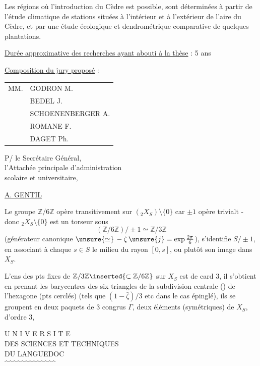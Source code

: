 Les régions où l'introduction du Cèdre est possible, sont déterminées à partir de l'étude climatique de stations situées à l'intérieur et à l'extérieur de l'aire du Cèdre, et par une étude écologique et dendrométrique comparative de quelques plantations.

\uline{Durée approximative des recherches ayant abouti à la thèse} : 5 ans

\uline{Composition du jury proposé} : \begin{tabular}[t]{ll}
MM. & GODRON M.\\
& BEDEL J.\\
& SCHOENENBERGER A.\\
& ROMANE F.\\
& DAGET Ph.
\end{tabular}

\begin{flushright}
P/ le Secrétaire Général,\\
l'Attachée principale d'administration\\
scolaire et universitaire,


\uline{A. GENTIL}
\end{flushright}


Le groupe $\mathbb Z/6\mathbb Z$ opère transitivement sur $({}_2X_S)\setminus\{0\}$ car $\pm1$ opère trivialt - donc \({}_2X_S\setminus\{0\}\) est un torseur sous
\[
(\mathbb Z/6\mathbb Z)/\pm1\simeq\mathbb Z/3\mathbb Z
\]
 (générateur canonique $\unsure{\simeq}\,-\bar\zeta\,\unsure{j}=\exp\frac{2\pi}{6}$),
  s'identifie  $S/\pm1$, en associant à chaque $s\in S$ le milieu du rayon $[0,s]$, ou plutôt son image dans $X_S$.

L'ens des pts fixes de $\mathbb Z/3\mathbb Z\inserted{\subset\mathbb Z/6\mathbb Z}$ sur $X_S$ est de card 3, il s'obtient en prenant les barycentres des six triangles de la subdivision centrale () de l'hexagone (pts cerclés) (tels que $(1-\bar\zeta)/3$ etc dans le cas épinglé), ils se groupent en deux paquets de 3  congrus  $\Gamma$,  deux éléments (symétriques) de $X_S$, d'ordre 3,


\begin{center}
U N I V E R S I T E\\
DES SCIENCES ET TECHNIQUES\\
DU LANGUEDOC\\
\textasciicircum\textasciicircum\textasciicircum\textasciicircum\textasciicircum\textasciicircum\textasciicircum\textasciicircum\textasciicircum\textasciicircum\textasciicircum\textasciicircum\textasciicircum
\end{center}

